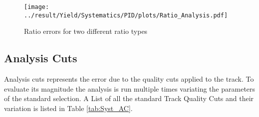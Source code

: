 \newpage
\begin{figure}
	\centering
		\texttt{[image: ../result/Yield/Systematics/PID/plots/Ratio\_Analysis.pdf]}
		\caption{Ratio errors for two different ratio types}
		\label{}
\end{figure}

\newpage
\subsection{Analysis Cuts}
Analysis cuts represents the error due to the quality cuts applied to the track. To evaluate its magnitude the analysis is run multiple times variating the parameters of the standard selection. A List of all the standard Track Quality Cuts and their variation is listed in Table \ref{tab:Syst_AC}.

